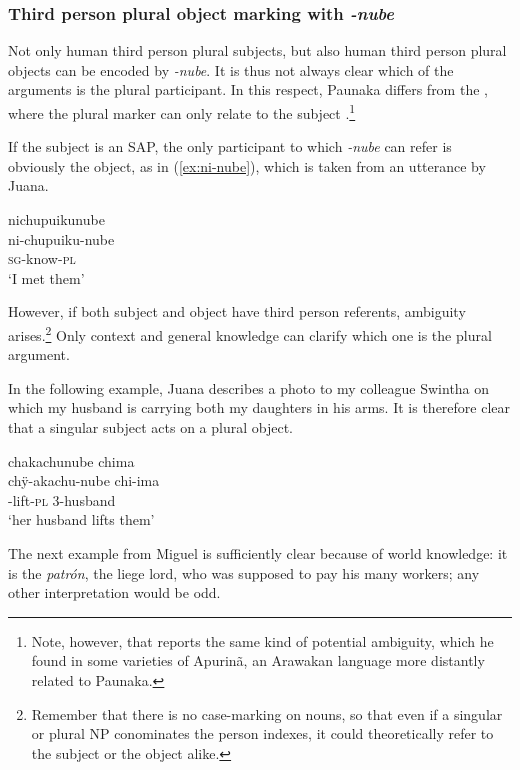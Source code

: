  \subsubsection{Third person plural object marking with \textit{-nube}} Not only human third person plural subjects, but also human third person plural objects can be encoded by \textit{-nube}. It is thus not always clear which of the arguments is the plural participant. In this respect, Paunaka differs from the , where the plural marker can only relate to the subject \citep[474--475]{Rose2011a}.\footnote{Note, however, that \citet[382-384, Footnote 1]{Facundes2000} reports the same kind of potential ambiguity, which he found in some varieties of Apurinã, an Arawakan language more distantly related to Paunaka.} 
 
 If the subject is an SAP, the only participant to which \textit{-nube} can refer is obviously the object, as in (\ref{ex:ni-nube}), which is taken from an utterance by Juana.
  
\newpage
 \ea\label{ex:ni-nube}
\begingl 
\glpreamble nichupuikunube\\
\gla ni-chupuiku-nube\\ 
\textsc{sg}-know-\textsc{pl}\\ 
\glft ‘I met them’
\trailingcitation{[jxx-p120515l-1.218]}
\xe

However, if both subject and object have third person referents, ambiguity arises.\footnote{Remember that there is no case-marking on nouns, so that even if a singular or plural NP conominates the person indexes, it could theoretically refer to the subject or the object alike.} Only context and general knowledge can clarify which one is the plural argument.

In the following example, Juana describes a photo to my colleague Swintha on which my husband is carrying both my daughters in his arms. It is therefore clear that a singular subject acts on a plural object.

\ea\label{ex:3sg-3pl-1}
\begingl 
\glpreamble chakachunube chima\\
\gla chÿ-akachu-nube chi-ima\\ 
-lift-\textsc{pl} 3-husband\\ 
\glft ‘her husband lifts them’
\trailingcitation{[jxx-p141024s-1.31]}
\xe

The next example from Miguel is sufficiently clear because of world knowledge: it is the \textit{patrón}, the liege lord, who was supposed to pay his many workers; any other interpretation would be odd.

